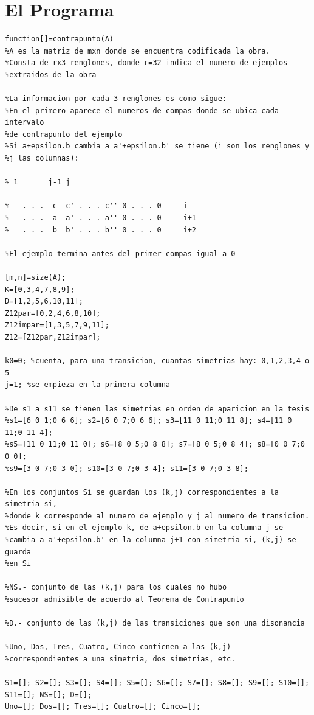 \documentclass[letterpaper,12pt]{book}
\theoremstyle{definition} \newtheorem{Def}{Definición}[chapter]
\theoremstyle{definition} \newtheorem{Teo}{Teorema}[chapter]
\theoremstyle{definition} \newtheorem{Pro}{Proposición}[chapter]
\theoremstyle{definition} \newtheorem{Lema}{Lema}[chapter]
\begin{document}
 
\chapter{El Programa}\label{Programa} 

{\tiny
\begin{verbatim}
function[]=contrapunto(A)
%A es la matriz de mxn donde se encuentra codificada la obra. 
%Consta de rx3 renglones, donde r=32 indica el numero de ejemplos
%extraidos de la obra

%La informacion por cada 3 renglones es como sigue:
%En el primero aparece el numeros de compas donde se ubica cada intervalo 
%de contrapunto del ejemplo
%Si a+epsilon.b cambia a a'+epsilon.b' se tiene (i son los renglones y 
%j las columnas):

% 1       j-1 j
 
%   . . .  c  c' . . . c'' 0 . . . 0     i
%   . . .  a  a' . . . a'' 0 . . . 0     i+1  
%   . . .  b  b' . . . b'' 0 . . . 0     i+2 

%El ejemplo termina antes del primer compas igual a 0

[m,n]=size(A);
K=[0,3,4,7,8,9];
D=[1,2,5,6,10,11];
Z12par=[0,2,4,6,8,10];
Z12impar=[1,3,5,7,9,11];
Z12=[Z12par,Z12impar];

k0=0; %cuenta, para una transicion, cuantas simetrias hay: 0,1,2,3,4 o 5
j=1; %se empieza en la primera columna

%De s1 a s11 se tienen las simetrias en orden de aparicion en la tesis
%s1=[6 0 1;0 6 6]; s2=[6 0 7;0 6 6]; s3=[11 0 11;0 11 8]; s4=[11 0 11;0 11 4];
%s5=[11 0 11;0 11 0]; s6=[8 0 5;0 8 8]; s7=[8 0 5;0 8 4]; s8=[0 0 7;0 0 0];
%s9=[3 0 7;0 3 0]; s10=[3 0 7;0 3 4]; s11=[3 0 7;0 3 8];

%En los conjuntos Si se guardan los (k,j) correspondientes a la simetria si,
%donde k corresponde al numero de ejemplo y j al numero de transicion.
%Es decir, si en el ejemplo k, de a+epsilon.b en la columna j se 
%cambia a a'+epsilon.b' en la columna j+1 con simetria si, (k,j) se guarda
%en Si

%NS.- conjunto de las (k,j) para los cuales no hubo 
%sucesor admisible de acuerdo al Teorema de Contrapunto

%D.- conjunto de las (k,j) de las transiciones que son una disonancia

%Uno, Dos, Tres, Cuatro, Cinco contienen a las (k,j) 
%correspondientes a una simetria, dos simetrias, etc.

S1=[]; S2=[]; S3=[]; S4=[]; S5=[]; S6=[]; S7=[]; S8=[]; S9=[]; S10=[]; S11=[]; NS=[]; D=[];
Uno=[]; Dos=[]; Tres=[]; Cuatro=[]; Cinco=[]; 


\end{verbatim}}
\end{document}
